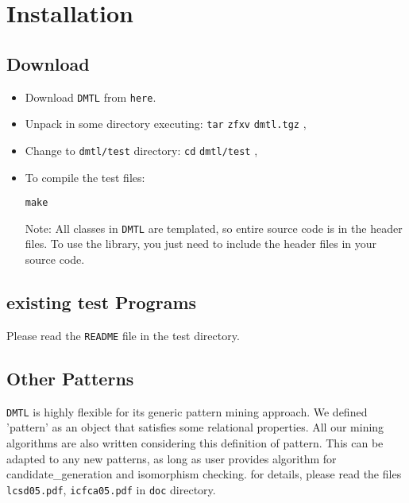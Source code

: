 \section{Installation}\label{installation}
\subsection{Download}\label{installation_download}
\begin{itemize}
\item Download {\tt DMTL} from {\tt here}.\item Unpack in some directory executing: {\tt tar} {\tt zfxv} {\tt dmtl.tgz} ,\item Change to {\tt dmtl/test} directory: {\tt cd} {\tt dmtl/test} ,\item To compile the test files:

\footnotesize\begin{verbatim}make \end{verbatim}
\normalsize
 Note: All classes in {\tt DMTL} are templated, so entire source code is in the header files. To use the library, you just need to include the header files in your source code.\end{itemize}
\subsection{existing test Programs}\label{installation_Running}
Please read the {\tt README} file in the test directory.\subsection{Other Patterns}\label{installation_Mining}
{\tt DMTL} is highly flexible for its generic pattern mining approach. We defined 'pattern' as an object that satisfies some relational properties. All our mining algorithms are also written considering this definition of pattern. This can be adapted to any new patterns, as long as user provides algorithm for candidate\_\-generation and isomorphism checking. for details, please read the files {\tt lcsd05.pdf}, {\tt icfca05.pdf} in {\tt doc} directory. 